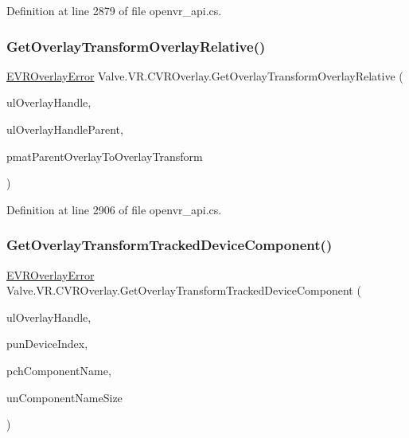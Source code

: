 Definition at line 2879 of file openvr\+\_\+api.\+cs.

\mbox{\label{class_valve_1_1_v_r_1_1_c_v_r_overlay_ac33ac44e9c4371235387157d4435381e}} 
\subsubsection{\texorpdfstring{GetOverlayTransformOverlayRelative()}{GetOverlayTransformOverlayRelative()}}
{\footnotesize\ttfamily \mbox{\hyperlink{namespace_valve_1_1_v_r_aaee5c5144f42b7969d45b854f51b0c18}{E\+V\+R\+Overlay\+Error}} Valve.\+V\+R.\+C\+V\+R\+Overlay.\+Get\+Overlay\+Transform\+Overlay\+Relative (\begin{DoxyParamCaption}\item[{ulong}]{ul\+Overlay\+Handle,  }\item[{ref ulong}]{ul\+Overlay\+Handle\+Parent,  }\item[{ref \mbox{\hyperlink{struct_valve_1_1_v_r_1_1_hmd_matrix34__t}{Hmd\+Matrix34\+\_\+t}}}]{pmat\+Parent\+Overlay\+To\+Overlay\+Transform }\end{DoxyParamCaption})}



Definition at line 2906 of file openvr\+\_\+api.\+cs.

\mbox{\label{class_valve_1_1_v_r_1_1_c_v_r_overlay_af663765f0c438d849a9c9e3983bd173d}} 
\subsubsection{\texorpdfstring{GetOverlayTransformTrackedDeviceComponent()}{GetOverlayTransformTrackedDeviceComponent()}}
{\footnotesize\ttfamily \mbox{\hyperlink{namespace_valve_1_1_v_r_aaee5c5144f42b7969d45b854f51b0c18}{E\+V\+R\+Overlay\+Error}} Valve.\+V\+R.\+C\+V\+R\+Overlay.\+Get\+Overlay\+Transform\+Tracked\+Device\+Component (\begin{DoxyParamCaption}\item[{ulong}]{ul\+Overlay\+Handle,  }\item[{ref uint}]{pun\+Device\+Index,  }\item[{System.\+Text.\+String\+Builder}]{pch\+Component\+Name,  }\item[{uint}]{un\+Component\+Name\+Size }\end{DoxyParamCaption})}



